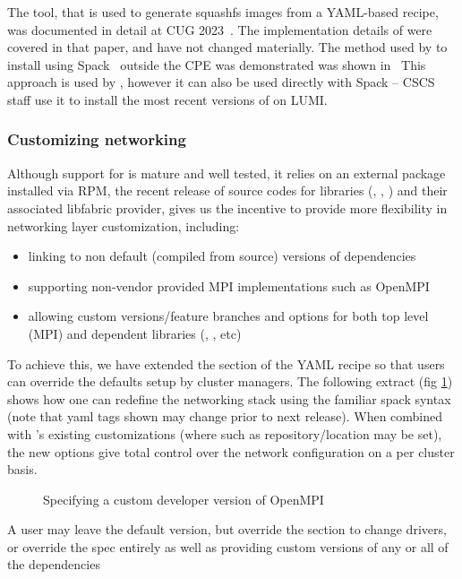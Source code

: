 The  \stackinator tool, that is used to generate squashfs images from a YAML-based recipe, was documented in detail at CUG 2023~\cite{uenv2023}.
The implementation details of \stackinator were covered in that paper, and have not changed materially.
The method used by \stackinator to install \craympich using Spack~\cite{gamblin:sc15} outside the CPE was demonstrated was shown in~\cite{uenv2023}
This approach is used by \stackinator, however it can also be used directly with Spack -- CSCS staff use it to install the most recent versions of \craympich on LUMI.

\subsubsection{Customizing networking}
\label{sec:networking}
Although support for \craympich is mature and well tested, it relies on an external package installed via RPM,
the recent release of source codes for \slingshot libraries (, , ) and their associated libfabric  provider,
gives us the incentive to provide more flexibility in networking layer customization, including:
\begin{itemize}
    \item linking \craympich to non default (compiled from source) versions of \slingshot dependencies
    \item supporting non-vendor provided MPI implementations such as OpenMPI
    \item allowing custom versions/feature branches and options for both top level (MPI) and dependent libraries (, , etc)
\end{itemize}
To achieve this, we have extended the  section of the \stackinator YAML recipe so that users can override the defaults setup by cluster managers. The following extract (fig \ref{lst:openmpi-config}) shows how one can redefine the networking stack using the familiar spack syntax (note that yaml tags shown may change prior to next release). When combined with \stackinator's existing  customizations (where  such as  repository/location may be set), the new options give total control over the network configuration on a per cluster basis.
\begin{figure}[htp!]
    
    \caption{Specifying a custom developer version of OpenMPI}
    \label{lst:openmpi-config}
\end{figure}
A user may leave the default \craympich version, but override the  section to change drivers, or override the  spec entirely as well as providing custom versions of any or all of the dependencies

